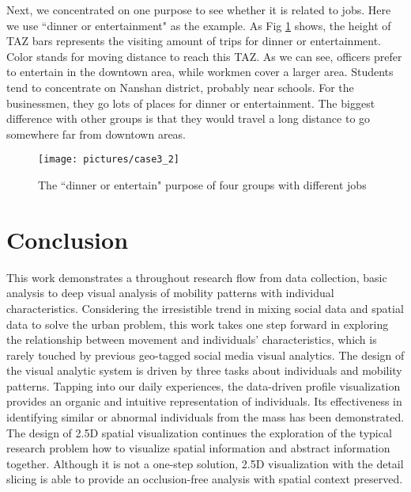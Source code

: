 Next, we concentrated on one purpose to see whether it is related to jobs. Here we use ``dinner or entertainment" as the example. As Fig \ref{case32} shows, the height of TAZ bars represents the visiting amount of trips for dinner or entertainment. Color stands for moving distance to reach this TAZ. As we can see, officers prefer to entertain in the downtown area, while workmen cover a larger area. Students tend to concentrate on Nanshan district, probably near schools. For the businessmen, they go lots of places for dinner or entertainment. The biggest difference with other groups is that they would travel a long distance to go somewhere far from downtown areas.

\begin{figure}[htb!]
 \centering %
 \texttt{[image: pictures/case3\_2]}
 \caption{The ``dinner or entertain" purpose of four groups with different jobs}
 \label{case32}
\end{figure}

\section{Conclusion}
\label{sec:conclusion}

This work demonstrates a throughout research flow from data collection, basic analysis to deep visual analysis of mobility patterns with individual characteristics. Considering the irresistible trend in mixing social data and spatial data to solve the urban problem, this work takes one step forward in exploring the relationship between movement and individuals' characteristics, which is rarely touched by previous geo-tagged social media visual analytics. The design of the visual analytic system is driven by three tasks about individuals and mobility patterns. Tapping into our daily experiences, the data-driven profile visualization provides an organic and intuitive representation of individuals. Its effectiveness in identifying similar or abnormal individuals from the mass has been demonstrated. The design of 2.5D spatial visualization continues the exploration of the typical research problem how to visualize spatial information and abstract information together. Although it is not a one-step solution, 2.5D visualization with the detail slicing is able to provide an occlusion-free analysis with spatial context preserved.


